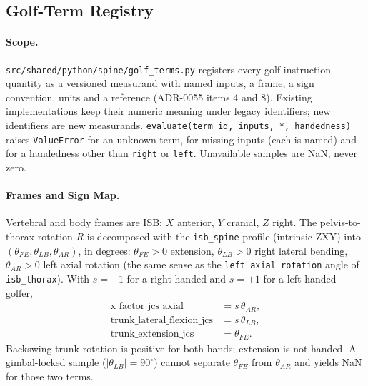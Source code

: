 \subsection{Golf-Term Registry}

\paragraph{Scope.}
\texttt{src/shared/python/spine/golf\_terms.py} registers every golf-instruction
quantity as a versioned measurand with named inputs, a frame, a sign convention,
units and a reference (ADR-0055 items 4 and 8). Existing implementations keep
their numeric meaning under legacy identifiers; new identifiers are new
measurands. \texttt{evaluate(term\_id, inputs, *, handedness)} raises
\texttt{ValueError} for an unknown term, for missing inputs (each is named) and
for a handedness other than \texttt{right} or \texttt{left}. Unavailable samples
are NaN, never zero.

\paragraph{Frames and Sign Map.}
Vertebral and body frames are ISB: $X$ anterior, $Y$ cranial, $Z$ right. The
pelvis-to-thorax rotation $R$ is decomposed with the \texttt{isb\_spine} profile
(intrinsic ZXY) into $(\theta_{FE},\theta_{LB},\theta_{AR})$, in degrees:
$\theta_{FE}>0$ extension, $\theta_{LB}>0$ right lateral bending, $\theta_{AR}>0$
left axial rotation (the same sense as the \texttt{left\_axial\_rotation} angle of
\texttt{isb\_thorax}). With $s=-1$ for a right-handed and $s=+1$ for a
left-handed golfer,
\begin{align}
  \text{x\_factor\_jcs\_axial} &= s\,\theta_{AR}, \\
  \text{trunk\_lateral\_flexion\_jcs} &= s\,\theta_{LB}, \\
  \text{trunk\_extension\_jcs} &= \theta_{FE}.
\end{align}
Backswing trunk rotation is positive for both hands; extension is not handed. A
gimbal-locked sample ($|\theta_{LB}|=90^\circ$) cannot separate $\theta_{FE}$ from
$\theta_{AR}$ and yields NaN for those two terms.

